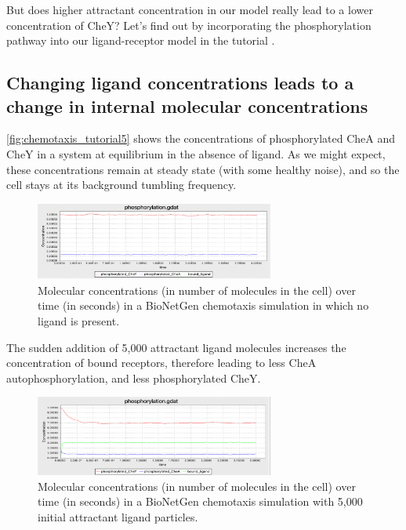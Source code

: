 But does higher attractant concentration in our model really lead to a lower concentration of CheY? Let's find out by incorporating the phosphorylation pathway into our ligand-receptor model in the tutorial .


\FloatBarrier
{}
{}
\subsection{Changing ligand concentrations leads to a change in internal molecular concentrations}

\autoref{fig:chemotaxis_tutorial5} shows the concentrations of phosphorylated CheA and CheY in a system at equilibrium in the absence of ligand. As we might expect, these concentrations remain at steady state (with some healthy noise), and so the cell stays at its background tumbling frequency.

\begin{figure}[h]
\centering
\mySfFamily
\includegraphics[width = 0.7\textwidth]{../images/chemotaxis_tutorial5.png}
\caption{Molecular concentrations (in number of molecules in the cell) over time (in seconds) in a BioNetGen chemotaxis simulation in which no ligand is present.}
\label{fig:chemotaxis_tutorial5}
\end{figure}

The sudden addition of 5,000 attractant ligand molecules increases the concentration of bound receptors, therefore leading to less CheA autophosphorylation, and less phosphorylated CheY.

\begin{figure}[h]
\centering
\mySfFamily
\includegraphics[width = 0.7\textwidth]{../images/chemotaxis_tutorial6.png}
\caption{Molecular concentrations (in number of molecules in the cell) over time (in seconds) in a BioNetGen chemotaxis simulation with 5,000 initial attractant ligand particles.}
\label{fig:chemotaxis_tutorial6}
\end{figure}


